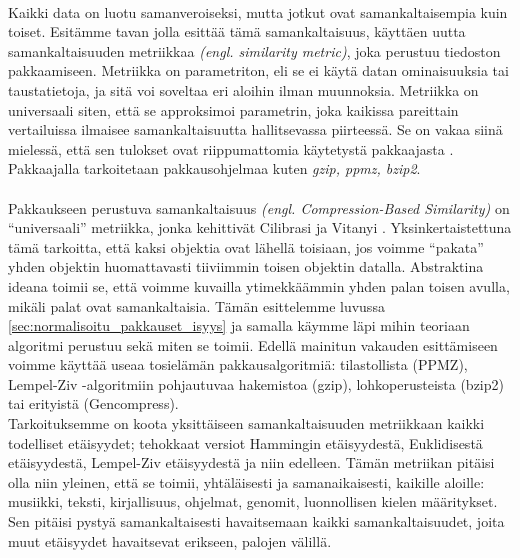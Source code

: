 \documentclass[12pt,finnish,draft,twoside]{tktltiki2}
\theoremstyle{definition}
\theoremstyle{remark}
\newcommand{\engl}[1]{\emph{(engl. #1)}}
\begin{document}
\paragraph{} %
\label{par:intro-1}
  Kaikki data on luotu samanveroiseksi, mutta jotkut ovat samankaltaisempia kuin toiset.
  Esitämme tavan jolla esittää tämä samankaltaisuus, käyttäen uutta samankaltaisuuden metriikkaa \engl{similarity metric}, joka perustuu tiedoston pakkaamiseen. Metriikka on parametriton, eli se ei käytä datan ominaisuuksia tai taustatietoja, ja sitä voi soveltaa eri aloihin ilman muunnoksia.
  Metriikka on universaali siten, että se approksimoi parametrin, joka kaikissa pareittain vertailuissa ilmaisee samankaltaisuutta hallitsevassa piirteessä. Se on vakaa siinä mielessä, että sen tulokset ovat riippumattomia käytetystä pakkaajasta \cite{CV05}. Pakkaajalla tarkoitetaan pakkausohjelmaa kuten \emph{gzip, ppmz, bzip2}.



\paragraph{} %
\label{par:intro-2}
  Pakkaukseen perustuva samankaltaisuus \engl{Compression-Based Similarity} on ``universaali'' metriikka, jonka kehittivät Cilibrasi ja Vitanyi \cite{CV05}. Yksinkertaistettuna tämä tarkoitta, että kaksi objektia ovat lähellä toisiaan, jos voimme ``pakata'' yhden objektin huomattavasti tiiviimmin toisen objektin datalla. Abstraktina ideana toimii se, että voimme kuvailla ytimekkäämmin yhden palan toisen avulla, mikäli palat ovat samankaltaisia. Tämän esittelemme luvussa \ref{sec:normalisoitu_pakkauset_isyys} ja samalla käymme läpi mihin teoriaan algoritmi perustuu sekä miten se toimii. Edellä mainitun vakauden esittämiseen voimme käyttää useaa tosielämän pakkausalgoritmiä: tilastollista (PPMZ), Lempel-Ziv -algoritmiin pohjautuvaa hakemistoa (gzip), lohkoperusteista (bzip2) tai erityistä (Gencompress).
\\

  Tarkoituksemme on koota yksittäiseen samankaltaisuuden metriikkaan kaikki todelliset etäisyydet; tehokkaat versiot Hammingin etäisyydestä, Euklidisestä etäisyydestä, Lempel-Ziv etäisyydestä ja niin edelleen. Tämän metriikan pitäisi olla niin yleinen, että se toimii, yhtäläisesti ja samanaikaisesti, kaikille aloille: musiikki, teksti, kirjallisuus, ohjelmat, genomit, luonnollisen kielen määritykset. Sen pitäisi pystyä samankaltaisesti havaitsemaan kaikki samankaltaisuudet, joita muut etäisyydet havaitsevat erikseen, palojen välillä.
\end{document}
